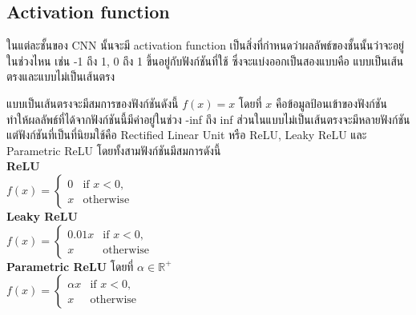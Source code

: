 \subsection*{Activation function\textsuperscript{\cite{activation}}}
ในแต่ละชั้นของ CNN นั้นจะมี activation function เป็นสิ่งที่กำหนดว่าผลลัพธ์ของชั้นนั้นว่าจะอยู่ในช่วงไหน 
เช่น -1 ถึง 1, 0 ถึง 1 ขึ้นอยู่กับฟังก์ชันที่ใช้ ซึ่งจะแบ่งออกเป็นสองแบบคือ แบบเป็นเส้นตรงและแบบไม่เป็นเส้นตรง

แบบเป็นเส้นตรงจะมีสมการของฟังก์ชันดังนี้ $ f(x) = x $ โดยที่ $x$ คือข้อมูลป้อนเข้าของฟังก์ชัน ทำให้ผลลัพธ์ที่ได้จากฟังก์ชันนี้มีค่าอยู่ในช่วง -inf ถึง inf
ส่วนในแบบไม่เป็นเส้นตรงจะมีหลายฟังก์ชัน แต่ฟังก์ชันที่เป็นที่นิยมใช้คือ Rectified Linear Unit หรือ ReLU, Leaky ReLU และ Parametric ReLU โดยทั้งสามฟังก์ชันมีสมการดังนี้\\
\textbf{ReLU}\\
$ f(x) =
\begin{cases}
	0 & \text{if } x < 0,\\
	x & \text{otherwise}
\end{cases}
$\\
\textbf{Leaky ReLU}\\
$ f(x) =
\begin{cases}
	0.01x & \text{if } x < 0,\\
	x & \text{otherwise}
\end{cases}
$\\
\textbf{Parametric ReLU} โดยที่ $\alpha\in\mathbb{R^+}$\\
$ f(x) =
\begin{cases}
	\alpha x & \text{if } x < 0,\\
	x & \text{otherwise}
\end{cases}
$

